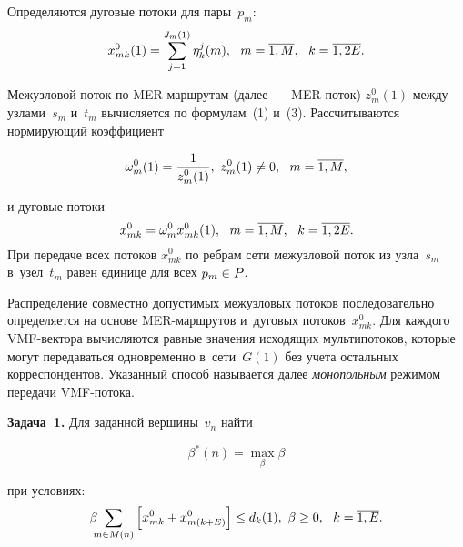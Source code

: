 \begin{multicols}{2}
 \vspace*{-2pt}

\noindent
Определяются  дуговые потоки для пары~$p_m$:
\begin{equation}
x_{mk}^0 (1) = \sum\limits_{j=1}^{J_m(1)} \eta_k^j(m), \ \ m = \overline{1, M}, \ \ k = 
\overline{1, 2E}. \label{e3-mal}
\end{equation}

\vspace*{-2pt}


Межузловой поток по MER-марш\-ру\-там (далее~---  MER-по\-ток) $z_{m}^0(1)$ между 
узлами~$s_m$ и~$t_m$ вычисляется  по формулам~(1) и~(3). Рассчитываются  
нормирующий коэффициент

\vspace*{2pt}

\noindent
\begin{equation*}
\omega_m^0(1) = \fr{1}{z_{m}^0(1)}, \ z_{m}^0(1) \not = 0, \ \ m = \ol{1, M}, %
\end{equation*}

\noindent
и дуговые потоки
\begin{equation}
x_{mk}^0 = \omega_m^0 x_{mk}^0(1), \ \ m = \overline{1, M}, \ \ k = \overline{1, 2E}.\label{e5-mal}
\end{equation}
При передаче всех потоков $x_{mk}^0$ по ребрам сети межузловой поток из узла~$s_m$ в~узел~$t_m$ равен единице для всех $p_m \hm\in P$.

Распределение совместно допустимых межузловых потоков последовательно 
определяется на основе MER-марш\-ру\-тов и~дуговых потоков~$x_{mk}^0$. Для каждого 
VMF-вектора вычисляются равные значения исходящих мультипотоков, которые могут 
передаваться одновременно в~сети~$G(1)$ без учета остальных корреспондентов. 
Указанный способ называется далее \textit{монопольным} режимом передачи VMF-по\-тока.

\smallskip

\noindent
\textbf{Задача~1.} Для заданной вершины~$v_n$ найти 

\noindent
$$
\beta^*(n) =  \max\limits_{\beta} \beta
$$

\vspace*{-4pt}

\noindent
при условиях: 
$$
\beta \!\!\!\sum\limits_{m \in M(n)} \left[ x_{mk}^0+  x_{m(k+E)}^0\right] 
\le d_k(1), \ \beta \ge 0, \  \  k =\overline{1, E}.
$$


\end{multicols}
